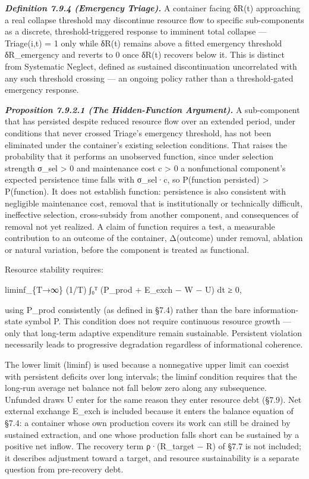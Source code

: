 \documentclass[
]{article}
\begin{document}
\emph{\textbf{Definition 7.9.4 (Emergency Triage).}} A container facing
δR(t) approaching a real collapse threshold may discontinue resource
flow to specific sub-components as a discrete, threshold-triggered
response to imminent total collapse --- Triage(i,t) = 1 only while δR(t)
remains above a fitted emergency threshold δR\_emergency and reverts to
0 once δR(t) recovers below it. This is distinct from Systematic
Neglect, defined as sustained discontinuation uncorrelated with any such
threshold crossing --- an ongoing policy rather than a threshold-gated
emergency response.

\emph{\textbf{Proposition 7.9.2.1 (The Hidden-Function Argument).}} A
sub-component that has persisted despite reduced resource flow over an
extended period, under conditions that never crossed Triage's emergency
threshold, has not been eliminated under the container's existing
selection conditions. That raises the probability that it performs an
unobserved function, since under selection strength σ\_sel
\textgreater{} 0 and maintenance cost c \textgreater{} 0 a nonfunctional
component's expected persistence time falls with σ\_sel·c, so P(function
\textbar{} persisted) \textgreater{} P(function). It does not establish
function: persistence is also consistent with negligible maintenance
cost, removal that is institutionally or technically difficult,
ineffective selection, cross-subsidy from another component, and
consequences of removal not yet realized. A claim of function requires a
test, a measurable contribution to an outcome of the container,
Δ(outcome) under removal, ablation or natural variation, before the
component is treated as functional.

Resource stability requires:

liminf\_\{T→∞\} (1/T) ∫₀ᵀ (P\_prod + E\_exch − W − U) dt ≥ 0,

using P\_prod consistently (as defined in §7.4) rather than the bare
information-state symbol P. This condition does not require continuous
resource growth --- only that long-term adaptive expenditure remain
sustainable. Persistent violation necessarily leads to progressive
degradation regardless of informational coherence.

The lower limit (liminf) is used because a nonnegative upper limit can
coexist with persistent deficits over long intervals; the liminf
condition requires that the long-run average net balance not fall below
zero along any subsequence. Unfunded draws U enter for the same reason
they enter resource debt (§7.9). Net external exchange E\_exch is
included because it enters the balance equation of §7.4: a container
whose own production covers its work can still be drained by sustained
extraction, and one whose production falls short can be sustained by a
positive net inflow. The recovery term ρ·(R\_target − R) of §7.7 is not
included; it describes adjustment toward a target, and resource
sustainability is a separate question from pre-recovery debt.
\end{document}
